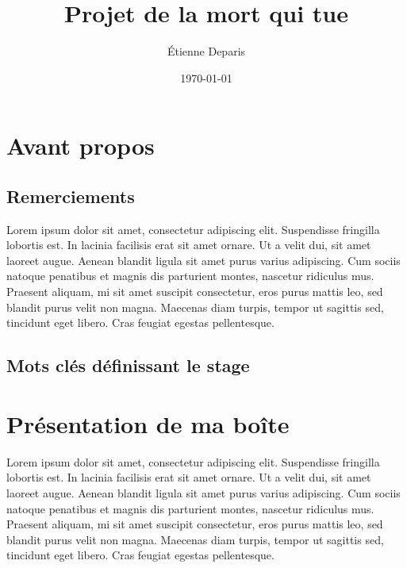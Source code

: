 \documentclass[a4paper,12pt]{report}
\title{Projet de la mort qui tue}
\author{Étienne Deparis}
\date{\today}
\begin{document}
\renewcommand{\labelitemi}{\large\textcolor{othergreen}{\fg}}
\stagepdtitre
\restoregeometry

\chapter{Avant propos}
\section{Remerciements}

Lorem ipsum dolor sit amet, consectetur adipiscing elit. Suspendisse
fringilla lobortis est. In lacinia facilisis erat sit amet ornare. Ut
a velit dui, sit amet laoreet augue. Aenean blandit ligula sit amet
purus varius adipiscing. Cum sociis natoque penatibus et magnis dis
parturient montes, nascetur ridiculus mus. Praesent aliquam, mi sit
amet suscipit consectetur, eros purus mattis leo, sed blandit purus
velit non magna. Maecenas diam turpis, tempor ut sagittis sed,
tincidunt eget libero. Cras feugiat egestas pellentesque.

\section{Mots clés définissant le stage}
\begin{center}
  \hspace{1mm}
  \hspace{1mm}
  \hspace{1mm}
  \vspace{2mm}

  \hspace{1mm}
  \hspace{1mm}
  \hspace{1mm}
\end{center}

\tableofcontents

\chapter{Présentation de ma boîte}
Lorem ipsum dolor sit amet, consectetur adipiscing elit. Suspendisse
fringilla lobortis est. In lacinia facilisis erat sit amet ornare. Ut
a velit dui, sit amet laoreet augue. Aenean blandit ligula sit amet
purus varius adipiscing. Cum sociis natoque penatibus et magnis dis
parturient montes, nascetur ridiculus mus. Praesent aliquam, mi sit
amet suscipit consectetur, eros purus mattis leo, sed blandit purus
velit non magna. Maecenas diam turpis, tempor ut sagittis sed,
tincidunt eget libero. Cras feugiat egestas pellentesque.
\end{document}
